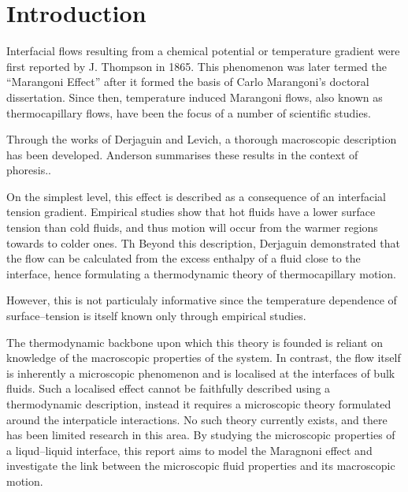 \section{Introduction}
Interfacial flows resulting from a chemical potential or temperature gradient were first reported by J. Thompson in 1865.\cite{JThompson}
This phenomenon was later termed the ``Marangoni Effect'' after it formed the basis of Carlo Marangoni's doctoral dissertation.\cite{Marangoni}
Since then, temperature induced Marangoni flows, also known as thermocapillary flows, have been the focus of a number of scientific studies.

Through the works of Derjaguin\cite{SurfaceForces} and Levich\cite{Levich}, a thorough macroscopic description has been developed.
Anderson summarises these results in the context of phoresis.\cite{Anderson}.

On the simplest level, this effect is described as a consequence of an interfacial tension gradient.
Empirical studies show that hot fluids have a lower surface tension than cold fluids, and thus motion will occur from the warmer regions towards to colder ones.
Th
Beyond this description, Derjaguin demonstrated that the flow can be calculated from the excess enthalpy of a fluid close to the interface, hence formulating a thermodynamic theory of thermocapillary motion.\cite{SurfaceForces}

However, this is not particulaly informative since the temperature dependence of surface--tension is itself known only through empirical studies.

The thermodynamic backbone upon which this theory is founded is reliant on knowledge of the macroscopic properties of the system.
In contrast, the flow itself is inherently a microscopic phenomenon and is localised at the interfaces of bulk fluids. 
Such a localised effect cannot be faithfully described using a thermodynamic description, instead it requires a microscopic theory formulated around the interpaticle interactions. 
No such theory currently exists, and there has been limited research in this area.\cite{HolgerBoppHampe}
By studying the microscopic properties of a liqud--liquid interface, this report aims to model the Maragnoni effect and investigate the link between the microscopic fluid properties and its macroscopic motion.

